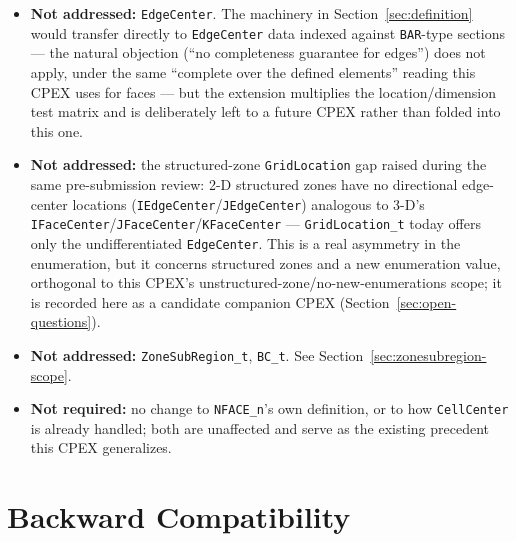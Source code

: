 \documentclass[11pt,letterpaper]{article}
\begin{document}
\begin{itemize}[leftmargin=2em]
\item \textbf{Not addressed:} \texttt{EdgeCenter}. The machinery in
  Section~\ref{sec:definition} would transfer directly to
  \texttt{EdgeCenter} data indexed against \texttt{BAR}-type sections
  --- the natural objection (``no completeness guarantee for edges'')
  does not apply, under the same ``complete over the defined
  elements'' reading this CPEX uses for faces --- but the extension
  multiplies the location/dimension test matrix and is deliberately
  left to a future CPEX rather than folded into this one.
\item \textbf{Not addressed:} the structured-zone \texttt{GridLocation}
  gap raised during the same pre-submission review: 2-D structured zones
  have no directional edge-center locations
  (\texttt{IEdgeCenter}/\texttt{JEdgeCenter}) analogous to 3-D's
  \texttt{IFaceCenter}/\texttt{JFaceCenter}/\texttt{KFaceCenter} ---
  \texttt{GridLocation\_t} today offers only the undifferentiated
  \texttt{EdgeCenter}. This is a real asymmetry in the enumeration, but
  it concerns structured zones and a new enumeration value, orthogonal
  to this CPEX's unstructured-zone/no-new-enumerations scope; it is
  recorded here as a candidate companion CPEX
  (Section~\ref{sec:open-questions}).
\item \textbf{Not addressed:} \texttt{ZoneSubRegion\_t}, \texttt{BC\_t}.
  See Section~\ref{sec:zonesubregion-scope}.
\item \textbf{Not required:} no change to \texttt{NFACE\_n}'s own
  definition, or to how \texttt{CellCenter} is already handled; both are
  unaffected and serve as the existing precedent this CPEX generalizes.
\end{itemize}

\section{Backward Compatibility}
\label{sec:backward-compat}
\end{document}
